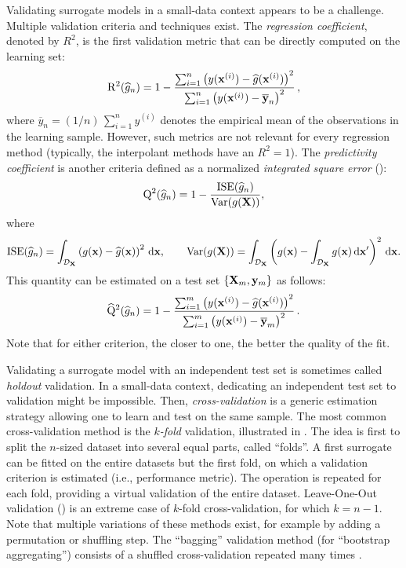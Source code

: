 Validating surrogate models in a small-data context appears to be a challenge. 
Multiple validation criteria and techniques exist. 
The \textit{regression coefficient}, denoted by $R^2$, is the first validation metric that can be directly computed on the learning set:
\begin{equation}
    \mathrm{R}^2(\widehat{g}_n) = 1 - \frac{ \sum_{i=1}^n  \left(y({\bf x}^{(i)}) - \widehat{g}({\bf x}^{(i)})\right)^2}{\sum_{i=1}^n \left(y({\bf x}^{(i)})-\overline{{\bf y}}_n\right)^2}\,,
\end{equation}
where $\overline{y}_n=(1/n)\,\sum_{i=1}^n y^{(i)}$ denotes the empirical mean of the observations in the learning sample. 
However, such metrics are not relevant for every regression method (typically, the interpolant methods have an $R^2=1$). 
The \textit{predictivity coefficient} \citep{NashS70} is another criteria defined as a normalized \textit{integrated square error} (): 
\begin{equation}
    \mathrm{Q}^2(\widehat{g}_n) = 1 - \frac{\mathrm{ISE}(\widehat{g}_n)}{\operatorname{Var}(g({\bf X}))}, 
\end{equation} 
where 
\begin{equation}
    \mathrm{ISE}(\widehat{g}_n) = \int_{\mathcal{D}_{{\bf X}}} \left(g({\bf x}) - \widehat{g}({\bf x})\right)^2 \, \mathrm{d}{\bf x}, \qquad
    \operatorname{Var}(g({\bf X})) = \int_{\mathcal{D}_{{\bf X}}} \left(g({\bf x}) - \int_{\mathcal{D}_{{\bf X}}} g({\bf x})\, \mathrm{d}{\bf x}' \right)^2 \, \mathrm{d}{\bf x}.
\end{equation}
This quantity can be estimated on a test set $\left\{{\bf X}_m, {\bf y}_m\right\}$ as follows: 
\begin{equation}
    \widehat{\mathrm{Q}}^2(\widehat{g}_n) = 1 - \frac{ \sum_{i=1}^m  \left(y({\bf x}^{(i)}) - \widehat{g}({\bf x}^{(i)})\right)^2}{\sum_{i=1}^m \left(y({\bf x}^{(i)}) - \overline{{\bf y}}_m\right)^2}\,.
\end{equation}
Note that for either criterion, the closer to one, the better the quality of the fit. 

Validating a surrogate model with an independent test set is sometimes called \textit{holdout} validation.
In a small-data context, dedicating an independent test set to validation might be impossible.
Then, \textit{cross-validation} is a generic estimation strategy allowing one to learn and test on the same sample. 
The most common cross-validation method is the \textit{$k$-fold} validation, illustrated in . 
The idea is first to split the $n$-sized dataset into several equal parts, called ``folds''. 
A first surrogate can be fitted on the entire datasets but the first fold, on which a validation criterion is estimated (i.e., performance metric). 
The operation is repeated for each fold, providing a virtual validation of the entire dataset. 
Leave-One-Out validation () is an extreme case of $k$-fold cross-validation, for which $k=n-1$. 
Note that multiple variations of these methods exist, for example by adding a permutation or shuffling step. 
The ``bagging'' validation method (for ``bootstrap aggregating'') consists of a shuffled cross-validation repeated many times \citep{breiman_1996_bagging}. 

